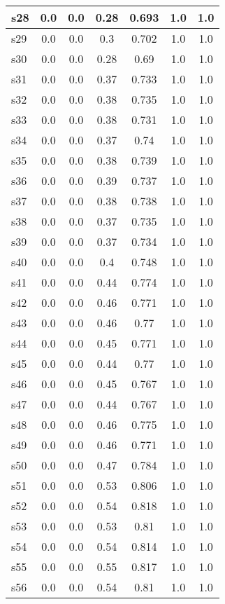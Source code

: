 \documentclass{article}
\begin{document}
\begin{tabular}{|l|c|c|c|c|c|c|}
\hline
s28 &0.0 & 0.0 & 0.28 & 0.693 & 1.0 & 1.0\\
\hline
s29 &0.0 & 0.0 & 0.3 & 0.702 & 1.0 & 1.0\\
\hline
s30 &0.0 & 0.0 & 0.28 & 0.69 & 1.0 & 1.0\\
\hline
s31 &0.0 & 0.0 & 0.37 & 0.733 & 1.0 & 1.0\\
\hline
s32 &0.0 & 0.0 & 0.38 & 0.735 & 1.0 & 1.0\\
\hline
s33 &0.0 & 0.0 & 0.38 & 0.731 & 1.0 & 1.0\\
\hline
s34 &0.0 & 0.0 & 0.37 & 0.74 & 1.0 & 1.0\\
\hline
s35 &0.0 & 0.0 & 0.38 & 0.739 & 1.0 & 1.0\\
\hline
s36 &0.0 & 0.0 & 0.39 & 0.737 & 1.0 & 1.0\\
\hline
s37 &0.0 & 0.0 & 0.38 & 0.738 & 1.0 & 1.0\\
\hline
s38 &0.0 & 0.0 & 0.37 & 0.735 & 1.0 & 1.0\\
\hline
s39 &0.0 & 0.0 & 0.37 & 0.734 & 1.0 & 1.0\\
\hline
s40 &0.0 & 0.0 & 0.4 & 0.748 & 1.0 & 1.0\\
\hline
s41 &0.0 & 0.0 & 0.44 & 0.774 & 1.0 & 1.0\\
\hline
s42 &0.0 & 0.0 & 0.46 & 0.771 & 1.0 & 1.0\\
\hline
s43 &0.0 & 0.0 & 0.46 & 0.77 & 1.0 & 1.0\\
\hline
s44 &0.0 & 0.0 & 0.45 & 0.771 & 1.0 & 1.0\\
\hline
s45 &0.0 & 0.0 & 0.44 & 0.77 & 1.0 & 1.0\\
\hline
s46 &0.0 & 0.0 & 0.45 & 0.767 & 1.0 & 1.0\\
\hline
s47 &0.0 & 0.0 & 0.44 & 0.767 & 1.0 & 1.0\\
\hline
s48 &0.0 & 0.0 & 0.46 & 0.775 & 1.0 & 1.0\\
\hline
s49 &0.0 & 0.0 & 0.46 & 0.771 & 1.0 & 1.0\\
\hline
s50 &0.0 & 0.0 & 0.47 & 0.784 & 1.0 & 1.0\\
\hline
s51 &0.0 & 0.0 & 0.53 & 0.806 & 1.0 & 1.0\\
\hline
s52 &0.0 & 0.0 & 0.54 & 0.818 & 1.0 & 1.0\\
\hline
s53 &0.0 & 0.0 & 0.53 & 0.81 & 1.0 & 1.0\\
\hline
s54 &0.0 & 0.0 & 0.54 & 0.814 & 1.0 & 1.0\\
\hline
s55 &0.0 & 0.0 & 0.55 & 0.817 & 1.0 & 1.0\\
\hline
s56 &0.0 & 0.0 & 0.54 & 0.81 & 1.0 & 1.0\\

\end{tabular}
\end{document}
